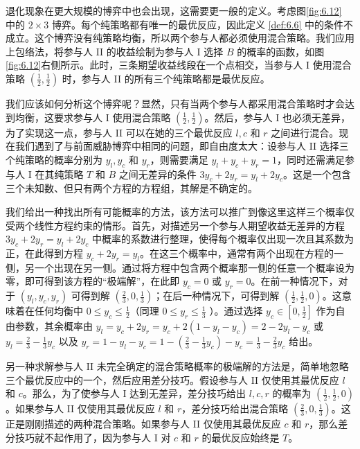 退化现象在更大规模的博弈中也会出现，这需要更一般的定义。考虑图\ref{fig:6.12} 中的 \(2 \times  3\) 博弈。每个纯策略都有唯一的最优反应，因此定义 \ref{def:6.6} 中的条件不成立。这个博弈没有纯策略均衡，所以两个参与人都必须使用混合策略。我们应用上包络法，将参与人 II 的收益绘制为参与人 I 选择 \(B\) 的概率的函数，如图 \ref{fig:6.12}右侧所示。此时，三条期望收益线段在一个点相交，当参与人 I 使用混合策略 \(\left( {\frac{1}{2},\frac{1}{2}}\right)\) 时，参与人 II 的所有三个纯策略都是最优反应。

我们应该如何分析这个博弈呢？显然，只有当两个参与人都采用混合策略时才会达到均衡，这要求参与人 \(\mathrm{I}\) 使用混合策略 \(\left( {\frac{1}{2},\frac{1}{2}}\right)\)。然后，参与人 I 也必须无差异，为了实现这一点，参与人 II 可以在她的三个最优反应 \(l,c\) 和 \(r\) 之间进行混合。现在我们遇到了与前面威胁博弈中相同的问题，即自由度太大：设参与人 II 选择三个纯策略的概率分别为 \({y}_{l},{y}_{c}\) 和 \({y}_{r}\)，则需要满足 \({y}_{l} + {y}_{c} + {y}_{r} = 1\)，同时还需满足参与人 I 在其纯策略 \(T\) 和 \(B\) 之间无差异的条件 \(3{y}_{c} + 2{y}_{r} = {y}_{l} + 2{y}_{c}\)。这是一个包含三个未知数、但只有两个方程的方程组，其解是不确定的。

我们给出一种找出所有可能概率的方法，该方法可以推广到像这里这样三个概率仅受两个线性方程约束的情形。首先，对描述另一个参与人期望收益无差异的方程 \(3{y}_{c} + 2{y}_{r} = {y}_{l} + 2{y}_{c}\) 中概率的系数进行整理，使得每个概率仅出现一次且其系数为正，在此得到方程 \({y}_{c} + 2{y}_{r} = {y}_{l}\)。在这三个概率中，通常有两个出现在方程的一侧，另一个出现在另一侧。通过将方程中包含两个概率那一侧的任意一个概率设为零，即可得到该方程的“极端解”，在此即 \({y}_{c} = 0\) 或 \({y}_{r} = 0\)。在前一种情况下，对于 \(\left( {{y}_{l},{y}_{c},{y}_{r}}\right)\) 可得到解 \(\left( {\frac{2}{3},0,\frac{1}{3}}\right)\)；在后一种情况下，可得到解 \(\left( {\frac{1}{2},\frac{1}{2},0}\right)\)。这意味着在任何均衡中 \(0 \leq  {y}_{c} \leq  \frac{1}{2}\)（同理 \({0 \leq  {y}_{r} \leq  \frac{1}{3}}\) ）。通过选择 \({y}_{c} \in  \left\lbrack  {0,\frac{1}{2}}\right\rbrack\) 作为自由参数，其余概率由 \({y}_{l} = {y}_{c} + 2{y}_{r} = {y}_{c} + 2\left( {1 - {y}_{l} - {y}_{c}}\right)  = 2 - 2{y}_{l} - {y}_{c}\) 或 \({y}_{l} = \frac{2}{3} - \frac{1}{3}{y}_{c}\) 以及 \({y}_{r} = 1 - {y}_{l} - {y}_{c} = 1 - \left( {\frac{2}{3} - \frac{1}{3}{y}_{c}}\right)  - {y}_{c} = \frac{1}{3} - \frac{2}{3}{y}_{c}\) 给出。

另一种求解参与人 II 未完全确定的混合策略概率的极端解的方法是，简单地忽略三个最优反应中的一个，然后应用差分技巧。假设参与人 II 仅使用其最优反应 \(l\) 和 \(c\)。那么，为了使参与人 I 达到无差异，差分技巧给出 \(l,c,r\) 的概率为 \(\left( {\frac{1}{2},\frac{1}{2},0}\right)\)。如果参与人 II 仅使用其最优反应 \(l\) 和 \(r\)，差分技巧给出混合策略 \(\left( {\frac{2}{3},0,\frac{1}{3}}\right)\)。这正是刚刚描述的两种混合策略。如果参与人 II 仅使用其最优反应 \(c\) 和 \(r\)，那么差分技巧就不起作用了，因为参与人 I 对 \(c\) 和 \(r\) 的最优反应始终是 \(T\)。

